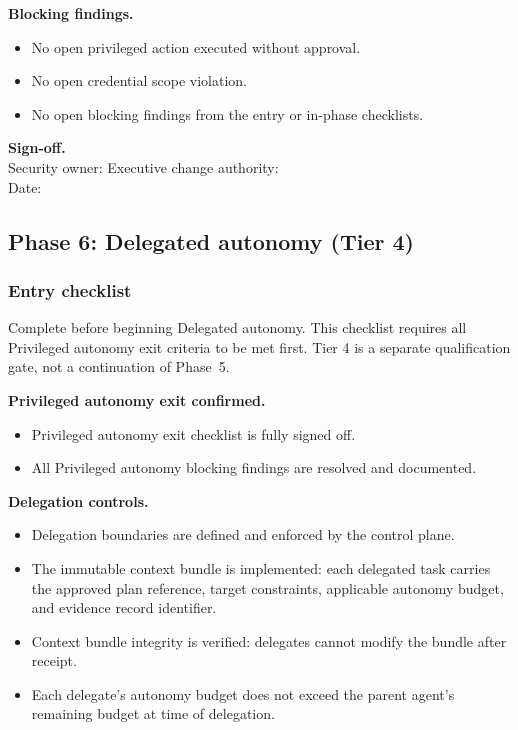 \documentclass[11pt]{article}
\begin{document}
\textbf{Blocking findings.}
\begin{itemize}
  \item No open privileged action executed without approval.
  \item No open credential scope violation.
  \item No open blocking findings from the entry or in-phase checklists.
\end{itemize}

\textbf{Sign-off.}\\Security owner: \underline{\hspace{1.5in}} \quad Executive change authority: \underline{\hspace{1.2in}}\\Date: \underline{\hspace{1.5in}}

\subsection{Phase 6: Delegated autonomy (Tier 4)}

\subsubsection{Entry checklist}
Complete before beginning Delegated autonomy. This checklist requires all Privileged autonomy exit criteria to be met first. Tier 4 is a separate qualification gate, not a continuation of Phase~5.

\textbf{Privileged autonomy exit confirmed.}
\begin{itemize}
  \item Privileged autonomy exit checklist is fully signed off.
  \item All Privileged autonomy blocking findings are resolved and documented.
\end{itemize}

\textbf{Delegation controls.}
\begin{itemize}
  \item Delegation boundaries are defined and enforced by the control plane.
  \item The immutable context bundle is implemented: each delegated task carries the approved plan reference, target constraints, applicable autonomy budget, and evidence record identifier.
  \item Context bundle integrity is verified: delegates cannot modify the bundle after receipt.
  \item Each delegate's autonomy budget does not exceed the parent agent's remaining budget at time of delegation.
\end{itemize}
\end{document}

